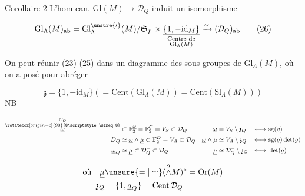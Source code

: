 \uline{Corollaire 2} L'hom can. $\mathrm{Gl}(M)\to\mathcal D_Q$ induit un isomorphisme

\[
\mathrm{Gl}_{\Lambda}(M)_{\mathrm{ab}}=\mathrm{Gl}_{\Lambda}^{\unsure{\prime}}(M)/\mathfrak S_I^+\times
\underset{\substack{\text{Centre de}\\\mathrm{Gl}_{\Lambda}(M)}}{\underline{\{1,-\mathrm{id}_M\}}}
\xrightarrow{\sim}(\mathcal D_Q)_{\mathrm{ab}} \tag*{(26)}
\]


\reversemarginpar{}\normalmarginpar

On peut réunir  (23) (25) dans un diagramme des sous-groupes de $\mathrm{Gl}_{\Lambda}(M)$, où on a posé pour abréger

\[
\mathfrak z=\{1,-\mathrm{id}_M\}\left(=\mathrm{Cent}(\mathrm{Gl}_{\Lambda}(M))=\mathrm{Cent}(\mathrm{Sl}_{\Lambda}(M))\right) \tag*{(27)}
\]
\uline{NB}

\[
\begin{aligned}
\overset{\substack{C_Q\\\rotatebox[origin=c]{90}{$\scriptstyle\simeq$}}}{\underline\omega}&\subset\mathbb F_2^{\underline\omega}=\mathbb F_2^C=V_S\subset\mathcal D_Q&
\underline\omega&=V_S\setminus\mathfrak z_Q&\longleftrightarrow&\ \mathrm{sg}(g)\\
D_Q&\simeq\underline\omega\wedge\underline\mu\subset\mathbb F_2^D=V_A\subset\mathcal D_Q&
\underline\omega\wedge\mu&\simeq V_A\setminus\mathfrak z_Q&\longleftrightarrow&\ \mathrm{sg}(g)\det(g)\\
\underline\omega_Q&\simeq\underline\mu\subset\mathcal D_Q^+\subset\mathcal D_Q&
\underline\mu&\simeq\mathcal D_Q^+\setminus\mathfrak z_Q&\longleftrightarrow&\ \det(g)
\end{aligned}
\]

\[
\begin{aligned}
\text{où}\quad \underline\mu&\unsure{=|\simeq}(\overset{2}{\wedge} M)^*=\mathrm{Or}(M)\\
\mathfrak z_Q&=\{1,\underline a_Q\}=\mathrm{Cent}\,\mathcal D_Q
\end{aligned}
\]


